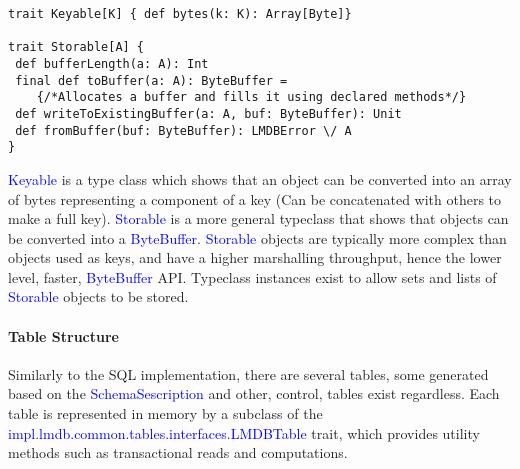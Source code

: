\documentclass[12pt,a4paper,twoside,openright]{report}
\newcommand\codeName[1]{\textcolor{blue}{#1}}
\begin{document}
{{\begin{framed}
\begin{verbatim}
trait Keyable[K] { def bytes(k: K): Array[Byte]}

trait Storable[A] {
 def bufferLength(a: A): Int
 final def toBuffer(a: A): ByteBuffer = 
    {/*Allocates a buffer and fills it using declared methods*/}
 def writeToExistingBuffer(a: A, buf: ByteBuffer): Unit
 def fromBuffer(buf: ByteBuffer): LMDBError \/ A
}
\end{verbatim}
\end{framed}			
\codeName{Keyable} is a type class which shows that an object can be converted into an array of bytes representing a component of a key (Can be concatenated with others to make a full key). \codeName{Storable} is a more general typeclass that shows that objects can be converted into a \codeName{ByteBuffer}. \codeName{Storable} objects are typically more complex than objects used as keys, and have a higher marshalling throughput, hence the lower level, faster, \codeName{ByteBuffer} API. Typeclass instances exist to allow sets and lists of \codeName{Storable} objects to be stored.	
			
		\paragraph{Table Structure}
	
 Similarly to the SQL implementation, there are several tables, some generated based on the \codeName{SchemaSescription} and other, control, tables exist regardless. Each table is represented in memory by a subclass of the \codeName{impl.lmdb.common.tables.interfaces.LMDBTable} trait, which provides utility methods such as transactional reads and computations.
 
\begin{center}
	\begin{tabular}{ |p{3cm}||p{3cm}|p{3cm}||p{3cm}|}
 	\hline
 		

\end{tabular}
\end{center}}}
\end{document}
